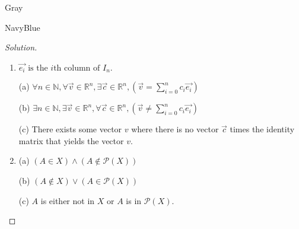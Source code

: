 \documentclass[12pt]{amsart}
\theoremstyle{named}
\newenvironment{soln}
{\begin{color}{Gray}\begin{framed}\begin{color}{NavyBlue}\begin{proof}[Solution]
\doublespacing}
{\end{proof}\end{color}\end{framed}\end{color}}
\theoremstyle{definition}
\begin{document}
\begin{soln}
\begin{enumerate}
        \item \phantom{ }
        
        \noindent $\displaystyle\vec{e_i} \text{ is the } i \text{th column of }I_n. $ 
        
        \noindent (a)
        $\forall n \in \mathbb N, \forall \vec{v} \in \mathbb R^n,\exists \vec{c} \in \mathbb R^n,(\vec{v} = \sum_{i=0}^n c_i\vec{e_i})$

        \noindent (b)
        $\exists n \in \mathbb N, \exists \vec{v} \in \mathbb R^n,\forall \vec{c} \in \mathbb R^n,(\vec{v} \neq \sum_{i=0}^n c_i\vec{e_i})$
        
        \noindent (c) There exists some vector $v$ where there is no vector $\vec{c}$ times
        the identity matrix that yields the vector $v$.

        \item \phantom{ }
        
        \noindent (a) $(A \in X) \land (A \notin \mathscr P (X))$

        \noindent (b) $(A \notin X) \lor (A \in \mathscr P (X))$
        
        \noindent (c) $A$ is either not in $X$ or $A$ is in $\mathscr P(X)$.

    \end{enumerate}
\end{soln}
\end{document}
